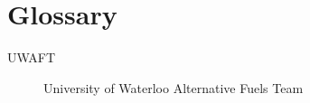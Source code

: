 \documentclass[ece]{uw-wkrpt}
\begin{document}
\appendix

\section{Glossary}\label{app:glossary}
\begin{description}
  \item[UWAFT] University of Waterloo Alternative Fuels Team
\end{description}
\end{document}
